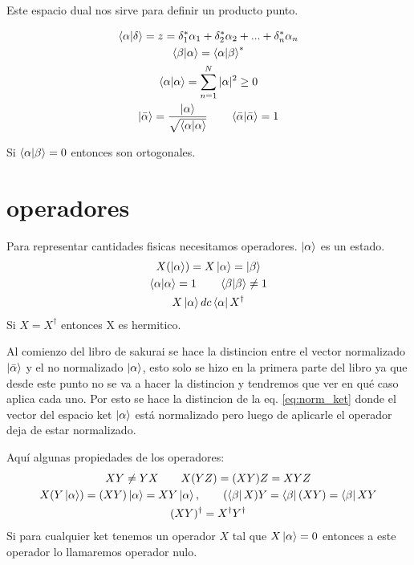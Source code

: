 \documentclass{article}
\newcommand{\caja}[2]{%
  \begin{tcolorbox}[colback=blue!5!white,colframe=blue!25!black,title=#1]
    #2
  \end{tcolorbox}%
}
\begin{document}
Este espacio dual nos sirve para definir un producto punto.
\caja{producto punto }{
  \begin{gather}
    \bra{\alpha}\ket{\delta} = z = \delta _{1 } ^ {* }\alpha _1 + \delta _2 ^ {* }\alpha _{2 } + ... + \delta _{n } ^ {* }\alpha_n\\
    \bra{\beta}\ket{\alpha}=\bra{\alpha}\ket{\beta}^ {* }\\
    \bra{\alpha}\ket{\alpha} = \sum_{n=1 }^{N }|\alpha|^ {2} \geq 0 \\
    \ket{\bar \alpha} = \frac{\ket{\alpha}}{\sqrt{\bra{\alpha}\ket{\alpha}} } \qquad
    \bra{\bar \alpha}\ket{\bar \alpha}=1
    \label{eq:bracket}
  \end{gather}
}

Si $ \bra{\alpha}\ket{\beta} = 0  $ entonces son ortogonales.

\section{operadores} %
\label{sec:operadores}
\caja{operadores }{
  Para representar cantidades fisicas necesitamos operadores. $ \ket{\alpha} $ es un estado.
  \begin{gather}
    X(\ket{\alpha}) =  X \ket{\alpha} = \ket{\beta}\\
    \bra{\alpha}\ket{\alpha} = 1 \qquad \bra{\beta}\ket{\beta} \neq 1
    \label{eq:norm_ket}\\
    X \ket{\alpha} dc \bra{\alpha}X ^ {\dag}
    \label{eq:operadores }
  \end{gather}
  Si $ X = X ^ {\dag} $ entonces X es hermitico. 
}
\caja{nota }{
  Al comienzo del libro de sakurai se hace la distincion entre el vector normalizado $ \ket{\bar \alpha} $ y el no normalizado $ \ket{\alpha} $, esto solo se hizo en la primera parte del libro ya que desde este punto no se va a hacer la distincion y tendremos que ver en qué caso aplica cada uno. Por esto se hace la distincion de la eq. \ref{eq:norm_ket} donde el vector del espacio ket $ \ket{\alpha} $ está normalizado pero luego de aplicarle el operador deja de estar normalizado.
}

Aquí algunas propiedades de los operadores: 
\begin{gather}
  XY \neq YX \qquad X(YZ) = (XY)Z = XYZ\\
  X(Y \ket{\alpha}) = (XY)\ket{\alpha}=XY \ket{\alpha}, \qquad (\bra{\beta}X)Y = \bra{\beta} (XY) = \bra{\beta}XY\\
  (XY)^ {\dag } = X ^ {\dag } Y ^ {\dag}
  \label{eq:prop.operadores }
\end{gather}
Si para cualquier ket tenemos un operador $X$ tal que $ X \ket{\alpha}=0  $ entonces a este operador lo llamaremos operador nulo.
\end{document}
